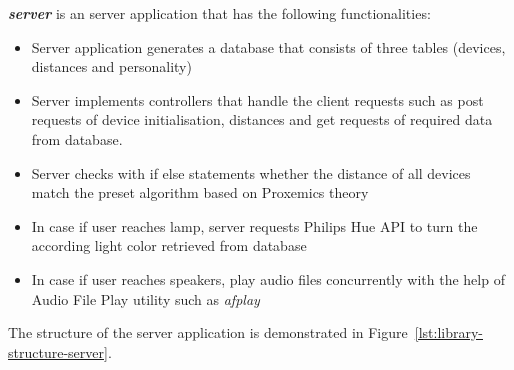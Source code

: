\textbf{\emph{server}} is an server application that has the following functionalities:
\begin{itemize}
    \item Server application generates a database that consists of three tables (devices, distances and personality)
    \item Server implements controllers that handle the client requests such as post requests of device initialisation,
        distances and get requests of required data from database.
    \item Server checks with if else statements whether the distance of all devices match the preset
        algorithm based on Proxemics theory
    \item In case if user reaches lamp, server requests Philips Hue API to turn the according light color retrieved from database
    \item In case if user reaches speakers, play audio files concurrently with the help of Audio File Play
        utility such as \emph{afplay}
\end{itemize}

The structure of the server application is demonstrated in Figure~\ref{lst:library-structure-server}.

